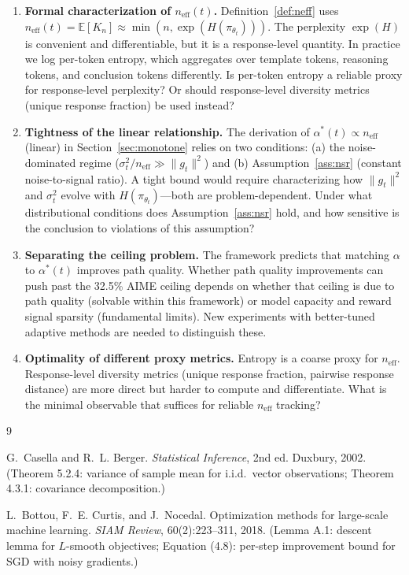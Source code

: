 \documentclass[11pt,a4paper]{article}
\newcommand{\E}{\mathbb{E}}
\newcommand{\neff}{n_{\mathrm{eff}}}
\newcommand{\gtrue}{g_t}
\newcommand{\pith}{\pi_{\theta_t}}
\newcommand{\alphaopt}{\alpha^*(t)}
\begin{document}
\begin{enumerate}
  \item \textbf{Formal characterization of $\neff(t)$.}
    Definition~\ref{def:neff} uses $\neff(t) = \E[K_n] \approx \min(n, \exp(H(\pith)))$.
    The perplexity $\exp(H)$ is convenient and differentiable, but it is a response-level quantity.
    In practice we log per-token entropy, which aggregates over template tokens, reasoning tokens,
    and conclusion tokens differently.
    Is per-token entropy a reliable proxy for response-level perplexity?
    Or should response-level diversity metrics (unique response fraction) be used instead?

  \item \textbf{Tightness of the linear relationship.}
    The derivation of $\alphaopt \propto \neff$ (linear) in Section~\ref{sec:monotone}
    relies on two conditions:
    (a) the noise-dominated regime ($\sigma_t^2/\neff \gg \|\gtrue\|^2$) and
    (b) Assumption~\ref{ass:nsr} (constant noise-to-signal ratio).
    A tight bound would require characterizing how $\|\gtrue\|^2$ and $\sigma_t^2$ evolve
    with $H(\pith)$---both are problem-dependent.
    Under what distributional conditions does Assumption~\ref{ass:nsr} hold, and how sensitive
    is the conclusion to violations of this assumption?

  \item \textbf{Separating the ceiling problem.}
    The framework predicts that matching $\alpha$ to $\alphaopt$ improves path quality.
    Whether path quality improvements can push past the 32.5\% AIME ceiling
    depends on whether that ceiling is due to path quality (solvable within this framework)
    or model capacity and reward signal sparsity (fundamental limits).
    New experiments with better-tuned adaptive methods are needed to distinguish these.

  \item \textbf{Optimality of different proxy metrics.}
    Entropy is a coarse proxy for $\neff$.
    Response-level diversity metrics (unique response fraction, pairwise response distance)
    are more direct but harder to compute and differentiate.
    What is the minimal observable that suffices for reliable $\neff$ tracking?
\end{enumerate}


\begin{thebibliography}{9}

G.~Casella and R.~L. Berger.
\newblock \emph{Statistical Inference}, 2nd ed.
\newblock Duxbury, 2002.
\newblock (Theorem 5.2.4: variance of sample mean for i.i.d.\ vector observations;
  Theorem 4.3.1: covariance decomposition.)

L.~Bottou, F.~E. Curtis, and J.~Nocedal.
\newblock Optimization methods for large-scale machine learning.
\newblock \emph{SIAM Review}, 60(2):223--311, 2018.
\newblock (Lemma A.1: descent lemma for $L$-smooth objectives;
  Equation (4.8): per-step improvement bound for SGD with noisy gradients.)

\end{thebibliography}
\end{document}
